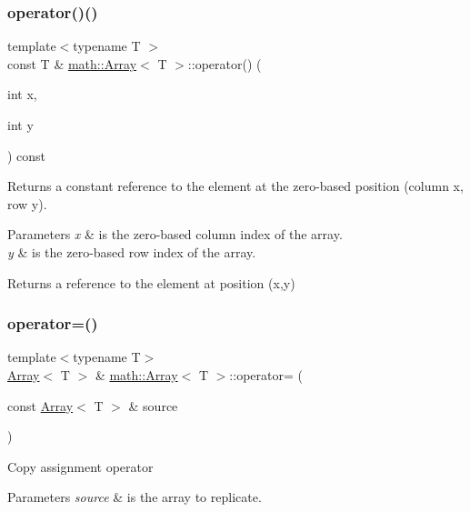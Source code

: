 \subsubsection{\texorpdfstring{operator()()}{operator()()}\hspace{0.1cm}{\footnotesize\ttfamily [2/2]}}
{\footnotesize\ttfamily template$<$typename T $>$ \\
const T \& \hyperlink{classmath_1_1_array}{math\+::\+Array}$<$ T $>$\+::operator() (\begin{DoxyParamCaption}\item[{int}]{x,  }\item[{int}]{y }\end{DoxyParamCaption}) const}

Returns a constant reference to the element at the zero-\/based position (column x, row y).


\begin{DoxyParams}{Parameters}
{\em x} & is the zero-\/based column index of the array. \\
\hline
{\em y} & is the zero-\/based row index of the array.\\
\hline
\end{DoxyParams}
\begin{DoxyReturn}{Returns}
a reference to the element at position (x,y) 
\end{DoxyReturn}
\mbox{\label{classmath_1_1_array_a5b164d8a39d58bfee90b6f878f3ae007}} 
\subsubsection{\texorpdfstring{operator=()}{operator=()}}
{\footnotesize\ttfamily template$<$typename T$>$ \\
\hyperlink{classmath_1_1_array}{Array}$<$ T $>$ \& \hyperlink{classmath_1_1_array}{math\+::\+Array}$<$ T $>$\+::operator= (\begin{DoxyParamCaption}\item[{const \hyperlink{classmath_1_1_array}{Array}$<$ T $>$ \&}]{source }\end{DoxyParamCaption})}

Copy assignment operator


\begin{DoxyParams}{Parameters}
{\em source} & is the array to replicate. \\
\hline
\end{DoxyParams}
\mbox{\label{classmath_1_1_array_a78beecb014ee77b0dff47dbbb946c704}} 

